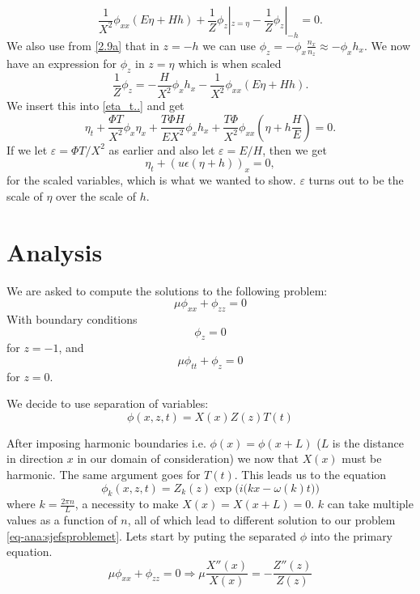\documentclass[12pt]{article}
\begin{document}
\begin{equation*}
    \frac{1}{X^2}\phi_{xx}(E\eta + Hh) + \frac{1}{Z}\phi_z|_{z=\eta} - \frac{1}{Z}\phi_z|_{-h} = 0.
\end{equation*}
We also use from \eqref{2.9a} that in $z = -h$ we can use $\phi_z = -\phi_x\frac{n_x}{n_z} \approx -\phi_x h_x$. We now have an expression for $\phi_z$ in $z = \eta$ which is when scaled
\begin{equation*}
    \frac{1}{Z}\phi_z = - \frac{H}{X^2}\phi_x h_x - \frac{1}{X^2}\phi_{xx}(E\eta + Hh).
\end{equation*}
We insert this into \eqref{eta_t..} and get
\begin{equation} 
    \eta_t + \frac{\Phi T}{X^2}\phi_x\eta_x + \frac{T\Phi H}{EX^2}\phi_x h_x + \frac{T\Phi}{X^2}\phi_{xx}(\eta + h\frac{H}{E}) = 0.
\end{equation}
If we let $\varepsilon = \Phi T/X^2 $ as earlier and also let $\varepsilon = E/H$, then we get
\begin{equation*}
    \eta_t + (u\epsilon(\eta + h))_x = 0,
\end{equation*}
for the scaled variables, which is what we wanted to show. $\varepsilon$ turns out to be the scale of $\eta$ over the scale of $h$.  

\section{Analysis}
We are asked to compute the solutions to the following problem:
\begin{equation}
\mu \phi _{xx} + \phi_{zz} = 0
\label{eq-ana:sjefsproblemet}
\end{equation}
With boundary conditions
\begin{equation}
\phi _z = 0
\end{equation}
for $z = -1$, and
\begin{equation}
\mu \phi_{tt} + \phi_z = 0
\end{equation}
for $z = 0$.

We decide to use separation of variables:
\begin{equation}
\phi(x,z,t) = X(x)Z(z)T(t)
\end{equation}

After imposing harmonic boundaries i.e. $\phi(x) = \phi(x+L)$ ($L$ is the distance in direction $x$ in our domain of consideration)
we now that $X(x)$ must be harmonic. The same argument goes for $T(t)$. This leads us to the equation
\begin{equation}
\phi_k (x,z,t) = Z_k(z) \exp \Big( i \big( kx - \omega(k)t \big) \Big)
\end{equation}
where $k=\frac{2 \pi n}{L}$, a necessity to make $X(x) = X(x+L) = 0$. $k$ can take multiple values as a function of $n$,
all of which lead to different solution to our problem \eqref{eq-ana:sjefsproblemet}. Lets start by puting the separated $\phi$ into the primary equation.
\begin{equation}
\mu \phi_{xx} + \phi_{zz} = 0 \Longrightarrow \mu \frac{X '' (x)}{X(x)} = -\frac{Z '' (z)}{Z(z)}
\label{eq-ana:separasjon}
\end{equation}
\end{document}
